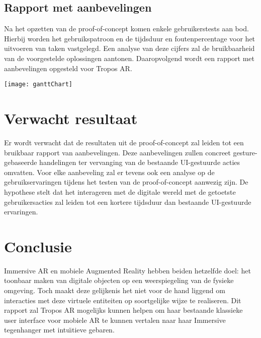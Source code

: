\subsection{Rapport met aanbevelingen}
\label{subsec:result-of-poc}
Na het opzetten van de proof-of-concept komen enkele gebruikerstests aan bod. %
Hierbij worden het gebruikspatroon en de tijdsduur en foutenpercentage voor het uitvoeren van taken vastgelegd.
Een analyse van deze cijfers zal de bruikbaarheid van de voorgestelde oplossingen aantonen.
Daaropvolgend wordt een rapport met aanbevelingen opgesteld voor Tropos AR.

\texttt{[image: ganttChart]}

\section{Verwacht resultaat}%
\label{sec:verwachte_resultaten}
Er wordt verwacht dat de resultaten uit de proof-of-concept zal leiden tot een bruikbaar rapport van aanbevelingen.
Deze aanbevelingen zullen concreet gesture-gebaseerde handelingen ter vervanging van de bestaande UI-gestuurde acties omvatten.
Voor elke aanbeveling zal er tevens ook een analyse op de gebruikservaringen tijdens het testen van de proof-of-concept aanwezig zijn.
De hypothese stelt dat het interageren met de digitale wereld met de getoetste gebruikersacties zal leiden tot een kortere tijdsduur dan bestaande UI-gestuurde ervaringen.

\section{Conclusie}%
\label{sec:conclusie}
Immersive AR en mobiele Augmented Reality hebben beiden hetzelfde doel: het toonbaar maken van digitale objecten op een weerspiegeling van de fysieke omgeving.
Toch maakt deze gelijkenis het niet voor de hand liggend om interacties met deze virtuele entiteiten op soortgelijke wijze te realiseren.
Dit rapport zal Tropos AR mogelijks kunnen helpen om haar bestaande klassieke user interface voor mobiele AR te kunnen vertalen naar haar Immersive tegenhanger met intu\"{\i}tieve gebaren.